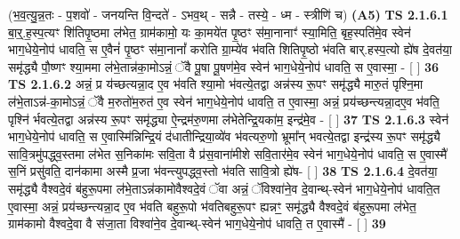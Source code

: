 \documentclass[17pt]{extarticle}
\begin{document}
                  \newline
                      (भ॒व॒त्यु॒न्न॒तः - प॒शवो॑ - जनयन्ति वि॒न्दते॑ - ऽभव॒थ् - सन्नै - तस्ये॒ - ध्म - स्त्रीणि॑ च)  \textbf{(A5)} \newline \newline
                                        \textbf{ TS 2.1.6.1} \newline
                  बा॒र्॒.ह॒स्प॒त्यꣳ शि॑तिपृ॒ष्ठमा ल॑भेत॒ ग्राम॑कामो॒ यः का॒मये॑त पृ॒ष्ठꣳ स॑मा॒नानाꣳ॑ स्या॒मिति॒ बृह॒स्पति॑मे॒व स्वेन॑ भाग॒धेये॒नोप॑ धावति॒ स ए॒वैनं॑ पृ॒ष्ठꣳ स॑मा॒नानां᳚ करोति ग्रा॒म्ये॑व भ॑वति शितिपृ॒ष्ठो भ॑वति बार्.हस्प॒त्यो ह्ये॑ष दे॒वत॑या॒ समृ॑द्ध्यै पौ॒ष्णꣳ श्या॒ममा ल॑भे॒तान्न॑का॒मोऽन्नं॒ ॅवै पू॒षा पू॒षण॑मे॒व स्वेन॑ भाग॒धेये॒नोप॑ धावति॒ स ए॒वास्मा॒ - [  ] \textbf{  36} \newline
                  \newline
                                \textbf{ TS 2.1.6.2} \newline
                  अन्नं॒ प्र य॑च्छत्यन्ना॒द ए॒व भ॑वति श्या॒मो भ॑वत्ये॒तद्वा अन्न॑स्य रू॒पꣳ समृ॑द्ध्यै मारु॒तं पृश्नि॒मा ल॑भे॒ताऽन्न॑-का॒मोऽन्नं॒ ॅवै म॒रुतो॑म॒रुत॑ ए॒व स्वेन॑ भाग॒धेये॒नोप॑ धावति॒ त ए॒वास्मा॒ अन्नं॒ प्रय॑च्छन्त्यन्ना॒द‌ए॒व भ॑वति॒ पृश्नि॑ र्भवत्ये॒तद्वा अन्न॑स्य रू॒पꣳ समृ॑द्ध्या ऐ॒न्द्रम॑रु॒णमा ल॑भेतेन्द्रि॒यका॑म॒ इन्द्र॑मे॒व - [  ] \textbf{  37} \newline
                  \newline
                                \textbf{ TS 2.1.6.3} \newline
                  स्वेन॑ भाग॒धेये॒नोप॑ धावति॒ स ए॒वास्मि॑न्निन्द्रि॒यं द॑धातीन्द्रिया॒व्ये॑व भ॑वत्यरु॒णो भ्रूमा᳚न् भवत्ये॒तद्वा इन्द्र॑स्य रू॒पꣳ समृ॑द्ध्यै सावि॒त्रमु॑पद्ध्व॒स्तमा ल॑भेत स॒निका॑मः सवि॒ता वै प्र॑स॒वाना॑मीशे सवि॒तार॑मे॒व स्वेन॑ भाग॒धेये॒नोप॑ धावति॒ स ए॒वास्मै॑ स॒निं प्रसु॑वति॒ दान॑कामा अस्मै प्र॒जा भ॑वन्त्युपद्ध्व॒स्तो भ॑वति सावि॒त्रो ह्ये॑ष- [  ] \textbf{  38} \newline
                  \newline
                                \textbf{ TS 2.1.6.4} \newline
                  दे॒वत॑या॒ समृ॑द्ध्यै वैश्वदे॒वं ब॑हुरू॒पमा ल॑भे॒ताऽन्न॑कामोवैश्वदे॒वं ॅवा अन्नं॒ ॅविश्वा॑ने॒व दे॒वान्थ्-स्वेन॑ भाग॒धेये॒नोप॑ धावति॒त ए॒वास्मा॒ अन्नं॒ प्रय॑च्छन्त्यन्ना॒द ए॒व भ॑वति बहुरू॒पो भ॑वतिबहुरू॒पꣳ ह्यन्नꣳ॒॒ समृ॑द्ध्यै वैश्वदे॒वं ब॑हुरू॒पमा ल॑भेत॒ ग्राम॑कामो वैश्वदे॒वा वै स॑जा॒ता विश्वा॑ने॒व दे॒वान्थ्-स्वेन॑ भाग॒धेये॒नोप॑ धावति॒ त ए॒वास्मै॑ - [  ] \textbf{  39} \newline
\end{document}

